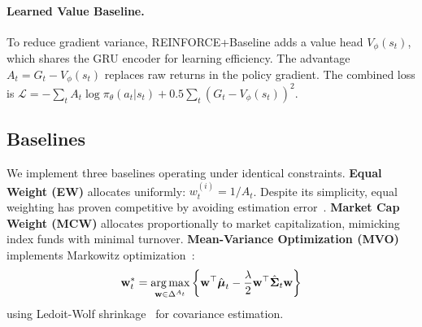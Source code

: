 \paragraph{Learned Value Baseline.} To reduce gradient variance, REINFORCE+Baseline adds a value head $V_\phi(s_t)$, which shares the GRU encoder for learning efficiency. The advantage $A_t = G_t - V_\phi(s_t)$ replaces raw returns in the policy gradient. The combined loss is $\mathcal{L} = -\sum_t A_t \log \pi_\theta(a_t | s_t) + 0.5 \sum_t (G_t - V_\phi(s_t))^2$.
 
\subsection{Baselines}
\label{sec:baselines}

We implement three baselines operating under identical constraints. \textbf{Equal Weight (EW)} allocates uniformly: $w_t^{(i)} = 1/A_t$. Despite its simplicity, equal weighting has proven competitive by avoiding estimation error~\citep{demiguel2009optimal}. \textbf{Market Cap Weight (MCW)} allocates proportionally to market capitalization, mimicking index funds with minimal turnover. \textbf{Mean-Variance Optimization (MVO)} implements Markowitz optimization~\citep{markowitz1952portfolio}:
\begin{equation}
    \mathbf{w}_t^* = \operatorname*{arg\,max}_{\mathbf{w} \in \Delta^{A_t}} \left\{ \mathbf{w}^\top \hat{\boldsymbol{\mu}}_t - \frac{\lambda}{2} \mathbf{w}^\top \hat{\boldsymbol{\Sigma}}_t \mathbf{w} \right\}
\end{equation}
using Ledoit-Wolf shrinkage~\citep{ledoit2004honey} for covariance estimation.
